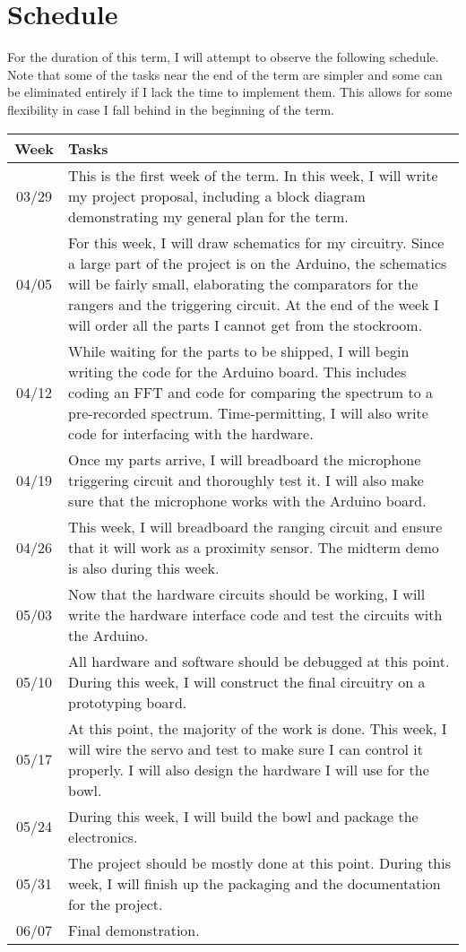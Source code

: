 \documentclass[12pt]{article}
\begin{document}
\section{Schedule}
\label{sec:schedule}

For the duration of this term, I will attempt to observe the following schedule.
Note that some of the tasks near the end of the term are simpler and some can be
eliminated entirely if I lack the time to implement them. This allows for some
flexibility in case I fall behind in the beginning of the term.

\setlength\extrarowheight{5pt}
\begin{tabularx}{\textwidth}{c X}
    Week & Tasks \\
    \midrule
    03/29 & This is the first week of the term. In this week, I will write my
    project proposal, including a block diagram demonstrating my general plan
    for the term. \\
    04/05 & For this week, I will draw schematics for my circuitry. Since a
    large part of the project is on the Arduino, the schematics will be fairly
    small, elaborating the comparators for the rangers and the triggering
    circuit. At the end of the week I will order all the parts I cannot get from
    the stockroom. \\
    04/12 & While waiting for the parts to be shipped, I will begin writing the
    code for the Arduino board. This includes coding an FFT and code for
    comparing the spectrum to a pre-recorded spectrum. Time-permitting, I will
    also write code for interfacing with the hardware. \\
    04/19 & Once my parts arrive, I will breadboard the microphone triggering
    circuit and thoroughly test it. I will also make sure that the microphone
    works with the Arduino board. \\
    04/26 & This week, I will breadboard the ranging circuit and ensure that it
    will work as a proximity sensor. The midterm demo is also during this week. \\
    05/03 & Now that the hardware circuits should be working, I will write the
    hardware interface code and test the circuits with the Arduino. \\
    05/10 & All hardware and software should be debugged at this point. During
    this week, I will construct the final circuitry on a prototyping board. \\
    05/17 & At this point, the majority of the work is done. This week, I will
    wire the servo and test to make sure I can control it properly. I will also
    design the hardware I will use for the bowl. \\
    05/24 & During this week, I will build the bowl and package the electronics. \\
    05/31 & The project should be mostly done at this point. During this week, I
    will finish up the packaging and the documentation for the project. \\
    06/07 & Final demonstration.
\end{tabularx}
\end{document}
